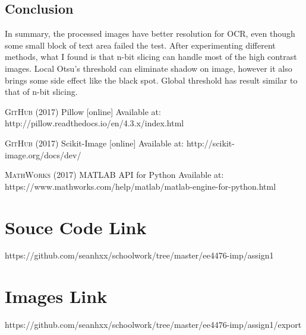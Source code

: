 \documentclass[titlepage]{article}
\begin{document}
\section{Conclusion}
\label{sec:orgf4833ea}
In summary, the processed images have better resolution for OCR, even though
some small block of text area failed the test. After experimenting different
methods, what I found is that n-bit slicing can handle most of the high
contrast images. Local Otsu's threshold can eliminate shadow on image, however
it also brings some side effect like the black spot. Global threshold has
result similar to that of n-bit slicing.



\begin{thebibliography}{5}

\textsc{GitHub} (2017) Pillow [online] Available at: http://pillow.readthedocs.io/en/4.3.x/index.html

\textsc{GitHub} (2017) Scikit-Image [online] Available at: http://scikit-image.org/docs/dev/

\textsc{MathWorks} (2017) MATLAB API for Python
\newline
[online] Available at: https://www.mathworks.com/help/matlab/matlab-engine-for-python.html 

\end{thebibliography}


\begin{appendices}

\chapter{Souce Code Link}
https://github.com/seanhxx/schoolwork/tree/master/ee4476-imp/assign1

\chapter{Images Link}
https://github.com/seanhxx/schoolwork/tree/master/ee4476-imp/assign1/export

\end{appendices}
\end{document}
